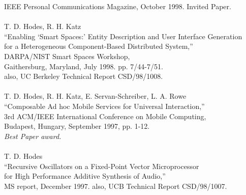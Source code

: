 \begin{tabbing}
\>\>       IEEE Personal Communications Magazine, October 1998. Invited Paper. \\
\smallskip \\[-3pt]
\>    T. D. Hodes, R. H. Katz \\
\>\>      ``Enabling `Smart Spaces:' Entity Description and User Interface
        Generation \\
\>\>\>     for a Heterogeneous Component-Based Distributed System,'' \\
\>\>       DARPA/NIST Smart Spaces Workshop,  \\
\>\>       Gaithersburg, Maryland, July 1998.  pp. 7/44-7/51.  \\
\>\>       also, UC Berkeley Technical Report CSD/98/1008. \\


\smallskip \\[-3pt]
\>    T. D. Hodes, R. H. Katz, E. Servan-Schreiber, L. A. Rowe \\
\>\>      ``Composable Ad hoc Mobile Services for Universal Interaction,'' \\
\>\>       3rd ACM/IEEE International Conference on Mobile Computing,  \\
\>\>        Budapest, Hungary, September 1997, pp. 1-12. \\
\>\>        {\em Best Paper award. }\\
\smallskip \\[-3pt]
\>    T. D. Hodes \\
\>\>      ``Recursive Oscillators on a Fixed-Point Vector Microprocessor \\
\>\>\>     for High Performance Additive Synthesis of Audio,'' \\
\>\>       MS report, December 1997. also, UCB Technical Report CSD/98/1007. \\


\end{tabbing}
